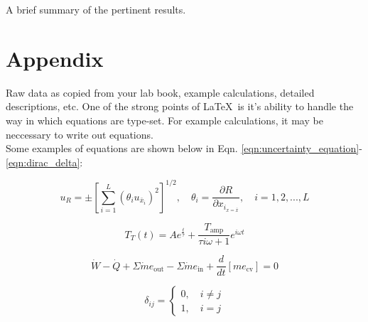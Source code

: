 \documentclass[12pt,letterpaper]{article}
\begin{document}
A brief summary of the pertinent results.

\section{Appendix}

Raw data as copied from your lab book, example calculations, detailed descriptions, etc.  One of the strong points of \LaTeX\ is it's ability to handle the way in which equations are type-set.  For example calculations, it may be neccessary to write out equations.\\ 

Some examples of equations are shown below in Eqn. \ref{eqn:uncertainty_equation}-\ref{eqn:dirac_delta}:

\begin{equation}
	u_R 
	=
	\pm
	\left[
		\sum_{i=1}^{L}
		\left( \theta_i u_{\bar{x}_i} \right)^2
	\right]^{1/2}
	,
	\quad
	\theta_i
	=
	\frac{\partial R}{\partial x_{i_{x=\bar{x}}} },
	\quad
	i=1,2,...,L
	\label{eqn:uncertainty_equation}
\end{equation}

\begin{equation}
	T_T (t)
	=
	A e^{\frac{t}{\tau}}
	+
	\frac{T_{\text{amp}}}{\tau i \omega + 1}
	e^{i\omega t}
\end{equation}

\begin{equation}
	\dot{W}
	-
	\dot{Q}
	+
	\Sigma
	\dot{m} e_{\text{out}}
	-
	\Sigma
	\dot{m} e_{\text{in}}
	+
	\frac{d}{dt}
	\left[ m e_{\text{cv}} \right]
	=
	0
	\label{eqn:energy_equation}
\end{equation}

\begin{equation}
	\delta_{ij}
	=
	\begin{cases}
		0, \quad i \ne j \\ 
		1, \quad i=j
	\end{cases}
	\label{eqn:dirac_delta}
\end{equation}



\end{document}
